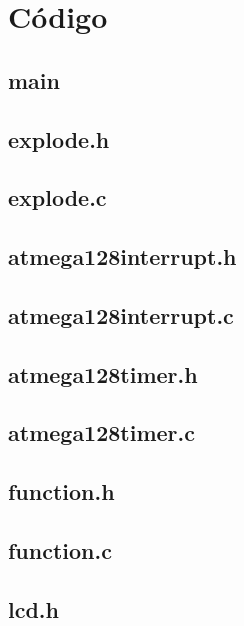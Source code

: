 \appendix
\chapter{Código}
\section*{main}

\newpage
\section*{explode.h}

\newpage
\section*{explode.c}

\newpage
\section*{atmega128interrupt.h}

\newpage
\section*{atmega128interrupt.c}

\newpage
\section*{atmega128timer.h}

\newpage
\section*{atmega128timer.c}

\newpage
\section*{function.h}

\newpage
\section*{function.c}

\newpage
\section*{lcd.h}

\newpage
